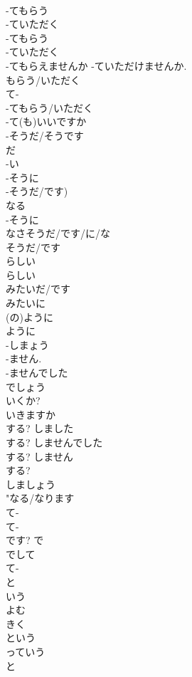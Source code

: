 \documentclass[8pt]{extreport}
\begin{document}
\begin{CJK}{UTF8}{min}
\\	-てもらう 
\\	-ていただく 
\\	-てもらう 
\\	-ていただく 
\\	-てもらえませんか -ていただけませんか. 
\\	もらう/いただく 
\\	て-
\\	-てもらう/いただく 
\\	-て(も)いいですか	
\\	-そうだ/そうです 
\\	だ 
\\	-い 
\\	-そうに 
\\	-そうだ/です) 
\\	なる 
\\	-そうに 
\\	なさそうだ/です/に/な	
\\	そうだ/です 
\\	らしい 
\\	らしい 
\\	みたいだ/です	
\\	みたいに	
\\	(の)ように	
\\	ように 
\\	-しまょう		
\\	-ません. 
\\	-ませんでした		
\\	でしょう		
\\	いくか?		
\\	いきますか		
\\	する?	しました	
\\	する?	しませんでした	
\\	する?	しません	
\\	する?
\\	しましょう	
\\	"なる/なります
\\	て-
\\	て-
\\	です?	で 
\\	でして 
\\	て-
\\	と 
\\	いう 
\\	よむ 
\\	きく 
\\	という 
\\	っていう	
\\	と 

\end{CJK}
\end{document}
